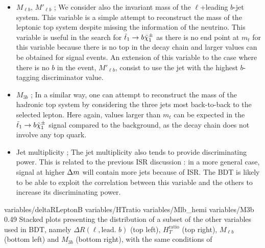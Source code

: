 \begin{itemize}
            hadronic activity in the same hemisphere as the $\MET$ compared to the total hadronic activity of the event,
            $H_T$. Because the visible energy recoils on the LSP in signal events, this variable tends to have
            low values for signal while being around 0.5 for background.
        \item $M_{\ell b}$, $M'_{\ell b}$ ; We consider also the invariant mass of the $\ell$+leading $b$-jet system. This variable
            is a simple attempt to reconstruct the mass of the leptonic top system despite missing
            the information of the neutrino. This variable is useful in the search for $\tilde{t}_1 \rightarrow
            b \tilde{\chi}_1^\pm$ as there is no end point at $m_t$ for this variable because there is no
            top in the decay chain and larger values can be obtained for signal events. An extension
            of this variable to the case where there is no $b$ in the event, $M'_{\ell b}$, consist
            to use the jet with the highest $b$-tagging discriminator value.
        \item $M_{3b}$ ; In a similar way, one can attempt to reconstruct the mass of the hadronic top system by considering the
            three jets most back-to-back to the selected lepton. Here again, values larger than $m_t$ can be expected in
            the $\tilde{t}_1 \rightarrow b \tilde{\chi}_1^\pm$ signal compared to the background, as the decay chain
            does not involve any top quark.
        \item Jet multiplicity ; The jet multiplicity also tends to provide discriminating power.
            This is related to the previous ISR discussion : in a more general case, signal
            at higher $\Delta m$ will contain more jets because of ISR. The BDT is likely to
            be able to exploit the correlation between this variable and the others to
            increase its discriminating power.
    \end{itemize}

                      {variables/deltaRLeptonB}
                      {variables/HTratio}
                      {variables/Mlb_hemi}
                      {variables/M3b}
                      {0.49}
                      {Stacked plots presenting the distribution of a subset of
                      the other variables used in BDT, namely $\Delta R( \ell, \text{lead. } b)$
                      (top left), $H_{T}^\text{ratio}$ (top right), $M_{\ell b}$ (bottom
                      left) and $M_{3b}$ (bottom right), with the same conditions of
                      }

